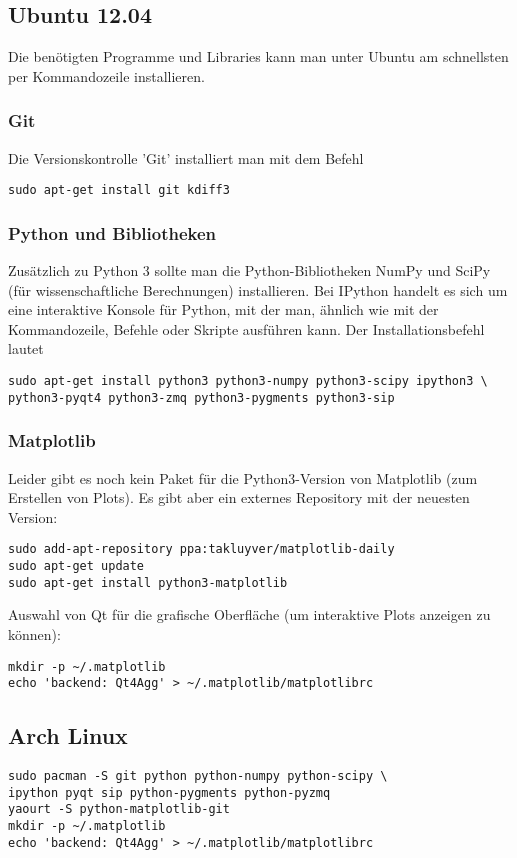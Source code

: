 \subsection{Ubuntu 12.04}
Die benötigten Programme und Libraries kann man unter Ubuntu am schnellsten per Kommandozeile installieren.

\subsubsection{Git}
Die Versionskontrolle 'Git' installiert man mit dem Befehl
\begin{verbatim}
sudo apt-get install git kdiff3
\end{verbatim}

\subsubsection{Python und Bibliotheken}
Zusätzlich zu Python 3 sollte man die Python-Bibliotheken NumPy und SciPy (für wissenschaftliche Berechnungen) installieren.
Bei IPython handelt es sich um eine interaktive Konsole für Python, mit der man, ähnlich wie mit der Kommandozeile, Befehle oder Skripte ausführen kann.
Der Installationsbefehl lautet
\begin{verbatim}
sudo apt-get install python3 python3-numpy python3-scipy ipython3 \
python3-pyqt4 python3-zmq python3-pygments python3-sip
\end{verbatim}

\subsubsection{Matplotlib}
Leider gibt es noch kein Paket für die Python3-Version von Matplotlib (zum Erstellen von Plots).
Es gibt aber ein externes Repository mit der neuesten Version:
\begin{verbatim}
sudo add-apt-repository ppa:takluyver/matplotlib-daily
sudo apt-get update
sudo apt-get install python3-matplotlib
\end{verbatim}
Auswahl von Qt für die grafische Oberfläche (um interaktive Plots anzeigen zu können):
\begin{verbatim}
mkdir -p ~/.matplotlib
echo 'backend: Qt4Agg' > ~/.matplotlib/matplotlibrc
\end{verbatim}

\subsection{Arch Linux}
\begin{verbatim}
sudo pacman -S git python python-numpy python-scipy \
ipython pyqt sip python-pygments python-pyzmq
yaourt -S python-matplotlib-git
mkdir -p ~/.matplotlib
echo 'backend: Qt4Agg' > ~/.matplotlib/matplotlibrc
\end{verbatim}

